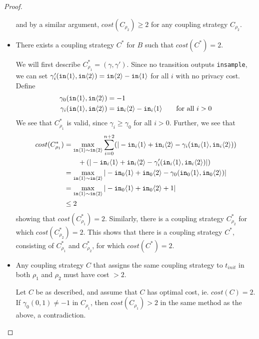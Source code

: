 \begin{proof}
\begin{itemize}
    and by a similar argument, $cost(C_{\rho_2})\geq 2$ for any coupling strategy $C_{\rho_2}$.

    \item There exists a coupling strategy $C^*$ for $B$ such that $cost(C^*) = 2$.
    
    We will first describe $C_{\rho_1}^* = (\gamma, \gamma')$. Since no transition outputs \texttt{insample}, we can set $\gamma_i'(\texttt{in}\langle1 \rangle, \texttt{in}\langle2 \rangle) = \texttt{in}\langle2 \rangle - \texttt{in}\langle1 \rangle$ for all $i$ with no privacy cost. Define 
    \begin{align*}
        \gamma_0(\texttt{in}\langle1 \rangle, \texttt{in}\langle2 \rangle) &= -1 \\
        \gamma_i(\texttt{in}\langle1 \rangle, \texttt{in}\langle2 \rangle) &= \texttt{in}_i\langle2 \rangle - \texttt{in}_i\langle1 \rangle \qquad \text{for all $i>0$}
    \end{align*}
    We see that $C^*_{\rho_1}$ is valid, since $\gamma_i\geq \gamma_{0}$ for all $i>0$. Further, we see that 
    \begin{align*}
        cost(C^*_{\rho_1}) &= \max_{\texttt{in}\langle1 \rangle\sim\texttt{in}\langle2 \rangle}\sum_{i=0}^{n+2}(|-\texttt{in}_i\langle1 \rangle+\texttt{in}_i\langle2 \rangle-\gamma_i(\texttt{in}_i\langle1 \rangle, \texttt{in}_i\langle2 \rangle))\\&\qquad+(|-\texttt{in}_i\langle1 \rangle+\texttt{in}_i\langle2 \rangle-\gamma_i'(\texttt{in}_i\langle1 \rangle, \texttt{in}_i\langle2 \rangle)|)\\
        &= \max_{\texttt{in}\langle1 \rangle\sim\texttt{in}\langle2 \rangle} |-\texttt{in}_0\langle1 \rangle+\texttt{in}_0\langle2 \rangle-\gamma_0(\texttt{in}_0\langle1 \rangle, \texttt{in}_0\langle2 \rangle)| \\
        &= \max_{\texttt{in}\langle1 \rangle\sim\texttt{in}\langle2 \rangle} |-\texttt{in}_0\langle1 \rangle+\texttt{in}_0\langle2 \rangle+1|\\
        &\leq 2 
    \end{align*}
    showing that $cost(C^*_{\rho_1}) = 2$. Similarly, there is a coupling strategy $C^*_{\rho_2}$ for which $cost(C^*_{\rho_2}) = 2$. This shows that there is a coupling strategy $C^*$, consisting of $C^*_{\rho_1}$ and $C^*_{\rho_2}$, for which $cost(C^*) = 2$.
    
    \item Any coupling strategy $C$ that assigns the same coupling strategy to $t_{init}$ in both $\rho_1$ and $\rho_2$ must have cost $>2$.
    
    Let $C$ be as described, and assume that $C$ has optimal cost, ie. $cost(C) = 2$. If $\gamma_0(0, 1) \neq -1$ in $C_{\rho_1}$, then $cost(C_{\rho_1}) > 2$ in the same method as the above, a contradiction.  


\end{itemize}
\end{proof}
